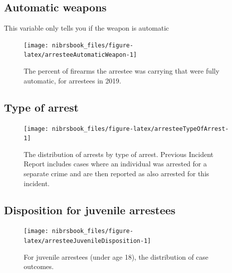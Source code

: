 \documentclass[
  12pt,
  openany]{book}
\begin{document}
\hypertarget{automatic-weapons-1}{%
\subsection{Automatic weapons}\label{automatic-weapons-1}}

This variable only tells you if the weapon is automatic

\begin{figure}

{\centering \texttt{[image: nibrsbook\_files/figure-latex/arresteeAutomaticWeapon-1]} 

}

\caption{The percent of firearms the arrestee was carrying that were fully automatic, for arrestees in 2019.}\label{fig:arresteeAutomaticWeapon}
\end{figure}

\hypertarget{type-of-arrest}{%
\subsection{Type of arrest}\label{type-of-arrest}}

\begin{figure}

{\centering \texttt{[image: nibrsbook\_files/figure-latex/arresteeTypeOfArrest-1]} 

}

\caption{The distribution of arrests by type of arrest. Previous Incident Report includes cases where an individual was arrested for a separate crime and are then reported as also arrested for this incident.}\label{fig:arresteeTypeOfArrest}
\end{figure}

\hypertarget{disposition-for-juvenile-arrestees}{%
\subsection{Disposition for juvenile arrestees}\label{disposition-for-juvenile-arrestees}}

\begin{figure}

{\centering \texttt{[image: nibrsbook\_files/figure-latex/arresteeJuvenileDisposition-1]} 

}

\caption{For juvenile arrestees (under age 18), the distribution of case outcomes.}\label{fig:arresteeJuvenileDisposition}
\end{figure}
\end{document}
